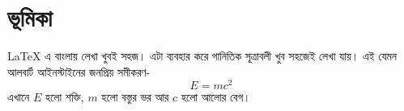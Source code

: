 \documentclass{article}
\begin{document}
\section*{ভূমিকা}

LaTeX এ বাংলায় লেখা খুবই সহজ। এটা ব্যবহার করে গানিতিক সূত্রাবলী খুব সহজেই লেখা যায়। 
 এই যেমন আলবার্ট আইনস্টাইনের জনপ্রিয় সমীকরণ-
\begin{equation}
E=mc^2
\end{equation} 
এখানে $E$ হলো শক্তি, $m$ হলো বস্তুর ভর আর $c$ হলো আলোর বেগ। 
\end{document}
